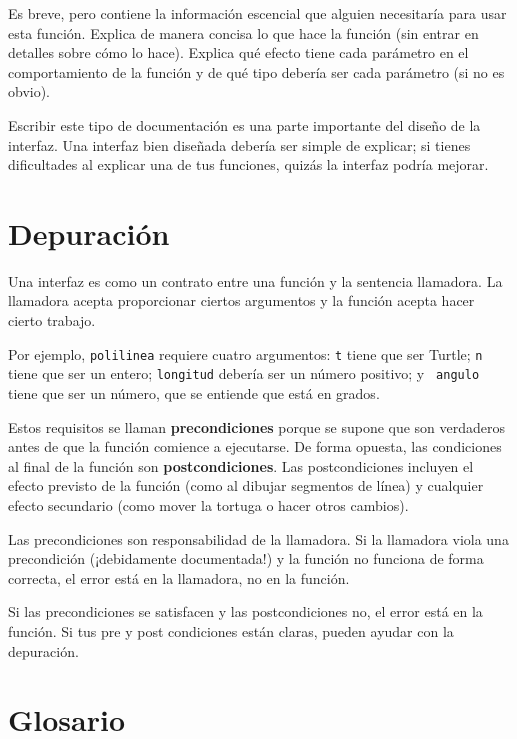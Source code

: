 \documentclass[10pt]{book}
\begin{document}
Es breve, pero contiene la información escencial
que alguien necesitaría para usar esta función.  Explica de manera concisa lo que
hace la función (sin entrar en detalles sobre cómo lo
hace).  Explica qué efecto tiene cada parámetro en el comportamiento de
la función y de qué tipo debería ser cada parámetro (si no es
obvio).

Escribir este tipo de documentación es una parte importante del diseño de la
interfaz.  Una interfaz bien diseñada debería ser simple de explicar;
si tienes dificultades al explicar una de tus funciones,
quizás la interfaz podría mejorar.


\section{Depuración}

Una interfaz es como un contrato entre una función y la sentencia llamadora.
La llamadora acepta proporcionar ciertos argumentos y la función
acepta hacer cierto trabajo.

Por ejemplo, {\tt polilinea} requiere cuatro argumentos: {\tt t} tiene que ser
Turtle; {\tt n} tiene que ser un
entero; {\tt longitud} debería ser un número positivo; y {\tt
  angulo} tiene que ser un número, que se entiende que está en grados.

Estos requisitos se llaman {\bf precondiciones} porque
se supone que son verdaderos antes de que la función comience a ejecutarse.
De forma opuesta, las condiciones al final de la función son
{\bf postcondiciones}.  Las postcondiciones incluyen el efecto
previsto de la función (como al dibujar segmentos de línea) y cualquier
efecto secundario (como mover la tortuga o hacer otros cambios).

Las precondiciones son responsabilidad de la llamadora.  Si la llamadora
viola una precondición (¡debidamente documentada!) y la función
no funciona de forma correcta, el error está en la llamadora, no en la función.

Si las precondiciones se satisfacen y las postcondiciones
no, el error está en la función.  Si tus pre y post condiciones
están claras, pueden ayudar con la depuración.


\section{Glosario}
\end{document}
